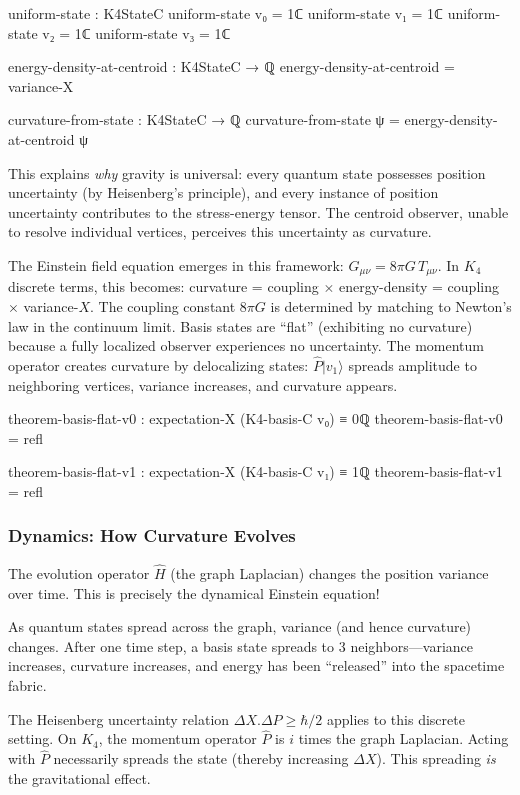 \documentclass[11pt,a4paper]{book}
\def\cdot{.}%
\begin{document}
\begin{code}
uniform-state : K4StateC
uniform-state v₀ = 1ℂ
uniform-state v₁ = 1ℂ
uniform-state v₂ = 1ℂ
uniform-state v₃ = 1ℂ

energy-density-at-centroid : K4StateC → ℚ
energy-density-at-centroid = variance-X

curvature-from-state : K4StateC → ℚ
curvature-from-state ψ = energy-density-at-centroid ψ
\end{code}

This explains \emph{why} gravity is universal: every quantum state possesses 
position uncertainty (by Heisenberg's principle), and every instance of position uncertainty 
contributes to the stress-energy tensor. The centroid observer, unable to 
resolve individual vertices, perceives this uncertainty as curvature.

The Einstein field equation emerges in this framework: $G_{\mu\nu} = 8\pi G\, T_{\mu\nu}$. In $K_4$ discrete terms, this becomes: curvature = coupling $\times$ energy-density = coupling $\times$ variance-$X$. The coupling constant $8\pi G$ is determined by matching to Newton's law in the continuum limit. Basis states are ``flat'' (exhibiting no curvature) because a fully localized observer experiences no uncertainty. The momentum operator creates curvature by delocalizing states: $\hat{P}|v_1\rangle$ spreads amplitude to neighboring vertices, variance increases, and curvature appears.

\begin{code}
theorem-basis-flat-v0 : expectation-X (K4-basis-C v₀) ≡ 0ℚ
theorem-basis-flat-v0 = refl

theorem-basis-flat-v1 : expectation-X (K4-basis-C v₁) ≡ 1ℚ
theorem-basis-flat-v1 = refl
\end{code}

\subsubsection{Dynamics: How Curvature Evolves}

The evolution operator $\hat{H}$ (the graph Laplacian) changes the position
variance over time. This is precisely the dynamical Einstein equation!

As quantum states spread across the graph, variance (and hence curvature) changes. After one time step, a basis state spreads to 3 neighbors---variance increases, curvature increases, and energy has been ``released'' into the spacetime fabric.

The Heisenberg uncertainty relation $\Delta X \cdot \Delta P \geq \hbar/2$ applies to this discrete setting. On $K_4$, the momentum operator $\hat{P}$ is $i$ times the graph Laplacian. Acting with $\hat{P}$ necessarily spreads the state (thereby increasing $\Delta X$). This spreading \emph{is} the gravitational effect.
\end{document}
